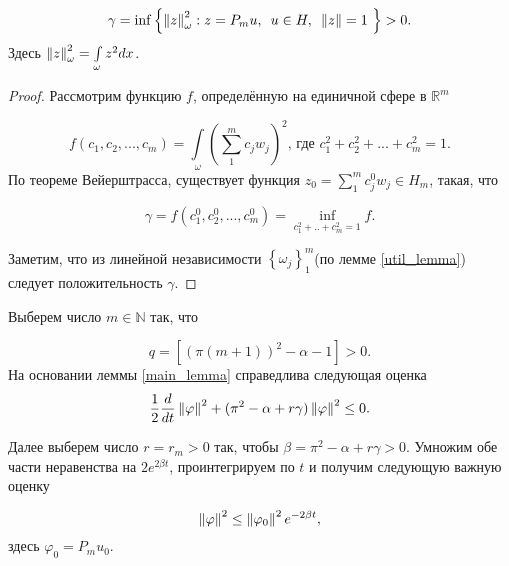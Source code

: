 \begin{lemma}\label{main_lemma}
    \begin{equation}
        \gamma = \inf{ \left\{ \left\lVert z\right\rVert^2_{\omega} : z = P_mu,\enskip u \in H, 
        \enskip \left\lVert z\right\rVert = 1 \ \right\} } > 0.
    \end{equation}
    Здесь $\left\lVert z\right\rVert^2_{\omega} = \int\limits_{\omega}{z^2dx}$.
\end{lemma}

\begin{proof}

    Рассмотрим функцию $f$, определённую на единичной сфере в $\mathbb{R}^m$

    \begin{equation}
       f(c_1, c_2, ..., c_m) = \int \limits_{\omega} {(\sum\limits_1^m {c_jw_j})^2}
       \text{, где } c_1^2 + c_2^2 + ... + c^2_m = 1.
    \end{equation}
    По теореме Вейерштрасса, существует функция 
    $z_0 = \sum\limits_1^m {c_j^0 w_j} \in H_m$, такая, что

    \begin{equation}
       \gamma = f(c_1^0, c_2^0, ..., c_m^0) = \inf \limits_{c_1^2 + .. + c_m^2 =
       1} {f}.
    \end{equation}

    Заметим, что из линейной независимости 
    $\left\{ \omega_j \right\}^m_1$(по лемме \ref{util_lemma}) следует 
    положительность $\gamma$.

\end{proof}

\par
\vspace{2ex}

Выберем число $m \in \mathbb{N}$ так, что

\begin{equation}
    q = [(\pi(m + 1))^2 - \alpha - 1] > 0.
\end{equation}
На основании леммы \ref{main_lemma} справедлива следующая оценка
\begin{equation*}
    \frac{1}{2} \frac{d}{dt} \left\lVert\varphi\right\rVert^2 + (\pi^2 - \alpha + r\gamma) 
    \left\lVert\varphi\right\rVert^2 \le 0.
\end{equation*}

Далее выберем число $r = r_m > 0$ так, чтобы
$\beta = \pi^2 - \alpha + r\gamma > 0$.
Умножим обе части неравенства на $2e^{2\beta t}$, проинтегрируем по $t$ и 
получим следующую важную оценку

\begin{equation}\label{phi_mark}
    \left\lVert\varphi\right\rVert^2 \le \left\lVert\varphi_0\right\rVert^2 e^{-2\beta t},
\end{equation}
здесь $\varphi_0 = P_m u_0$.
\vspace{2em}

